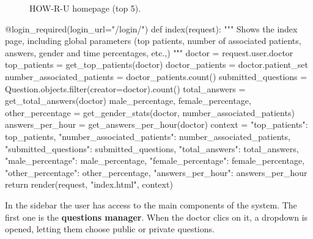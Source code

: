 \documentclass[12pt,english]{article}
\begin{document}
\begin{figure}[H]
    \caption{HOW-R-U homepage (top 5).}
\end{figure}
\newpage
\begin{python}[caption={Method to show the main homepage components}, captionpos=b]
  @login_required(login_url="/login/")
  def index(request):
      """
      Shows the index page, including global parameters (top patients, number of associated patients, answers, gender and time percentages, etc.,)
      """
      doctor = request.user.doctor
      top_patients = get_top_patients(doctor)
      doctor_patients = doctor.patient_set
      number_associated_patients = doctor_patients.count()
      submitted_questions = Question.objects.filter(creator=doctor).count()
      total_answers = get_total_answers(doctor)
      male_percentage, female_percentage, other_percentage = get_gender_stats(doctor, number_associated_patients)
      answers_per_hour = get_answers_per_hour(doctor)
      context = {
          "top_patients": top_patients,
          "number_associated_patients": number_associated_patients,
          "submitted_questions": submitted_questions,
          "total_answers": total_answers,
          "male_percentage": male_percentage,
          "female_percentage": female_percentage,
          "other_percentage": other_percentage,
          "answers_per_hour": answers_per_hour
      }
      return render(request, "index.html", context)
\end{python}

In the sidebar the user has access to the main components of the system. The first one is the \textbf{questions manager}. When the doctor clics on it, a dropdown is opened, letting them choose public or private questions.
\end{document}
